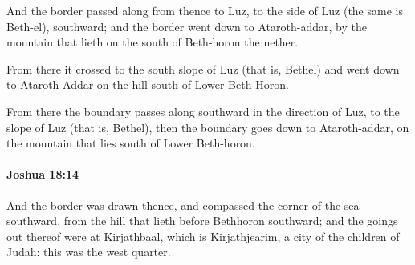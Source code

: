 			\begin{versebox}
					\item[BHS] 
					\item[ASV] And the border passed along from thence to Luz, to the side of Luz (the same is Beth-el), southward; and the border went down to Ataroth-addar, by the mountain that lieth on the south of Beth-horon the nether.
					\item[NIV] From there it crossed to the south slope of Luz (that is, Bethel) and went down to Ataroth Addar on the hill south of Lower Beth Horon.
					\item[NRSV] From there the boundary passes along southward in the direction of Luz, to the slope of Luz (that is, Bethel), then the boundary goes down to Ataroth-addar, on the mountain that lies south of Lower Beth-horon.
			\end{versebox}

		\paragraph{Joshua 18:14} %
			\label{JOSHUA-18-14}

			And the border was drawn thence, and compassed the corner of the sea southward, from the hill that lieth before Bethhoron southward; and the goings out thereof were at Kirjathbaal, which is Kirjathjearim, a city of the children of Judah: this was the west quarter.


